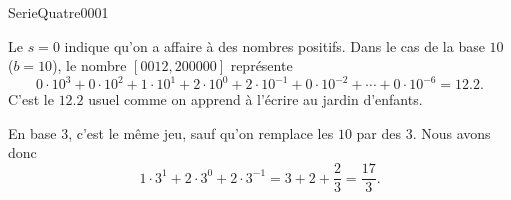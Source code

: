 
\begin{corrige}{SerieQuatre0001}

	Le $s=0$ indique qu'on a affaire à des nombres positifs. Dans le cas de la base $10$ ($b=10$), le nombre $[0012,200000]$ représente
	\begin{equation}
		0\cdot 10^{3}+0\cdot 10^2+1\cdot 10^1+2\cdot 10^0+2\cdot 10^{-1}+0\cdot 10^{-2}+\cdots+0\cdot 10^{-6}=12.2.
	\end{equation}
	C'est le $12.2$ usuel comme on apprend à l'écrire au jardin d'enfants.

	En base $3$, c'est le même jeu, sauf qu'on remplace les $10$ par des $3$. Nous avons donc
	\begin{equation}
		1\cdot 3^1+2\cdot 3^0+2\cdot 3^{-1}=3+2+\frac{ 2 }{ 3 }=\frac{ 17 }{ 3 }.
	\end{equation}

\end{corrige}
